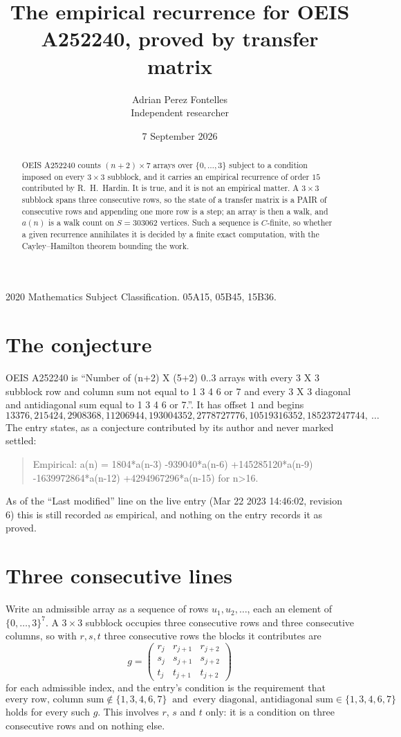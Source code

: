 \documentclass[11pt,a4paper]{article}
\title{The empirical recurrence for OEIS A252240, proved by transfer matrix}
\author{Adrian Perez Fontelles\\ \small Independent researcher}
\date{7 September 2026}
\theoremstyle{plain}
\theoremstyle{definition}
\begin{document}
\maketitle

\begin{abstract}
OEIS A252240 counts $(n+2)\times7$ arrays over $\{0,\dots,3\}$ subject to a condition imposed on
every $3\times3$ subblock, and it carries an empirical recurrence of order $15$
contributed by R.~H.~Hardin. It is true, and it is not an empirical matter. A $3\times3$
subblock spans three consecutive rows, so the state of a transfer matrix is a PAIR of
consecutive rows and appending one more row is a step; an array is then a walk, and
$a(n)$ is a walk count on $S=303062$ vertices. Such a sequence is $C$-finite, so whether a given
recurrence annihilates it is decided by a finite exact computation, with the Cayley--Hamilton
theorem bounding the work.
\end{abstract}

\noindent\small 2020 Mathematics Subject Classification. 05A15, 05B45, 15B36.\normalsize

\section{The conjecture}

OEIS A252240 is ``Number of (n+2) X (5+2) 0..3 arrays with every 3 X 3 subblock row and column sum not equal to 1 3 4 6 or 7 and every 3 X 3 diagonal and antidiagonal sum equal to 1 3 4 6 or 7.''. It has offset $1$ and begins
\[
13376, 215424, 2908368, 11206944, 193004352, 2778727776, 10519316352, 185237247744,\ \dots
\]
The entry states, as a conjecture contributed by its author and never marked settled:
\begin{quote}
Empirical: a(n) = 1804*a(n-3) -939040*a(n-6) +145285120*a(n-9) -1639972864*a(n-12) +4294967296*a(n-15) for n>16.
\end{quote}
As of the ``Last modified'' line on the live entry (Mar 22 2023 14:46:02, revision 6) this is still
recorded as empirical, and nothing on the entry records it as proved.

\section{Three consecutive lines}

Write an admissible array as a sequence of rows $u_1,u_2,\dots$, each an element of
$\{0,\dots,3\}^{7}$. A $3\times3$ subblock occupies three consecutive rows and
three consecutive columns, so with $r,s,t$ three consecutive rows the blocks it
contributes are
\[
g=\begin{pmatrix}r_j&r_{j+1}&r_{j+2}\\ s_j&s_{j+1}&s_{j+2}\\ t_j&t_{j+1}&t_{j+2}\end{pmatrix}
\]
for each admissible index, and the entry's condition is the requirement that
\[
\text{every row, column sum} \notin \{1,3,4,6,7\}\ \text{ and }\ \text{every diagonal, antidiagonal sum} \in \{1,3,4,6,7\}
\]
holds for every such $g$. This involves $r$, $s$ and $t$ only: it is a condition on
three consecutive rows and on nothing else.
\end{document}
